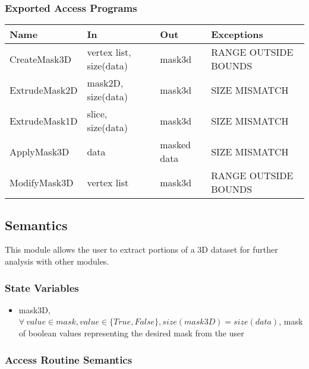 \documentclass[12pt, titlepage]{article}
\begin{document}
\subsubsection{Exported Access Programs}

\begin{center}
\begin{tabular}{p{3cm} p{4cm} p{4cm} p{4cm}}
\hline
\textbf{Name} & \textbf{In} & \textbf{Out} & \textbf{Exceptions} \\
\hline
CreateMask3D & vertex list, size(data) & mask3d & RANGE OUTSIDE BOUNDS \\
ExtrudeMask2D & mask2D, size(data) & mask3d & SIZE MISMATCH \\
ExtrudeMask1D & slice, size(data) & mask3d & SIZE MISMATCH \\
ApplyMask3D & data & masked data & SIZE MISMATCH \\
ModifyMask3D & vertex list & mask3d & RANGE OUTSIDE BOUNDS \\
\hline
\end{tabular}
\end{center}

\subsection{Semantics}
This module allows the user to extract portions of a 3D dataset for further analysis with other modules.

\subsubsection{State Variables}
\begin{itemize}
    \item mask3D, $\forall\ value \in mask, value \in \{True,False\}, size(mask3D) = size(data)$, mask of boolean values representing the desired mask from the user
\end{itemize}

\subsubsection{Access Routine Semantics}
\end{document}
